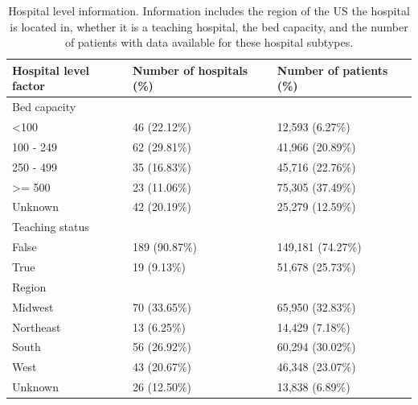\documentclass[english]{article}
\begin{document}

\begin{center}
\begin{table}
\begin{tabular}{l|p{4cm}|p{4cm}}
Hospital level factor & Number of hospitals (\%) & Number of patients (\%) \\ \hline
Bed capacity & & \\
\hspace{0.5cm} \textless{}100 & 46 (22.12\%) & 12,593 (6.27\%) \\
\hspace{0.5cm} 100 - 249 & 62 (29.81\%) & 41,966 (20.89\%) \\
\hspace{0.5cm} 250 - 499 & 35 (16.83\%) & 45,716 (22.76\%) \\
\hspace{0.5cm} \textgreater{}= 500 & 23 (11.06\%) & 75,305 (37.49\%) \\
\hspace{0.5cm} Unknown & 42 (20.19\%) & 25,279 (12.59\%) \\
Teaching status & & \\
\hspace{0.5cm} False & 189 (90.87\%) & 149,181 (74.27\%) \\
\hspace{0.5cm} True & 19 (9.13\%) & 51,678 (25.73\%) \\
Region & & \\
\hspace{0.5cm} Midwest & 70 (33.65\%) & 65,950 (32.83\%) \\
\hspace{0.5cm} Northeast & 13 (6.25\%) & 14,429 (7.18\%) \\
\hspace{0.5cm} South & 56 (26.92\%) & 60,294 (30.02\%) \\
\hspace{0.5cm} West & 43 (20.67\%) & 46,348 (23.07\%) \\
\hspace{0.5cm} Unknown & 26 (12.50\%) & 13,838 (6.89\%) \\
\hline
\end{tabular}
\caption{Hospital level information. Information includes the region of the US the hospital is located in, whether it is a teaching hospital, the bed capacity, and the number of patients with data available for these hospital subtypes.
\label{tab:hospital_info}}
\end{table}
\end{center}
\end{document}
